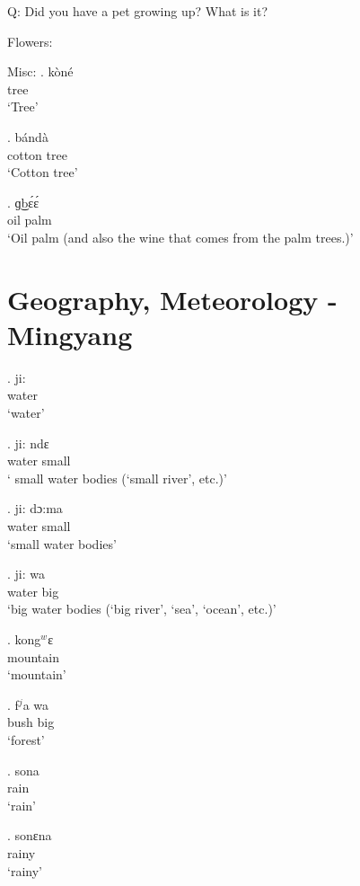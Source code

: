 \documentclass{assets/fieldnotes}
\begin{document}
Q: Did you have a pet growing up? What is it?

Flowers: 



Misc:
\exg. kòné\\
tree\\
`Tree'

\exg. bándà\\
cotton tree\\
`Cotton tree'

\exg. ɡ͜bɛ́ɛ́\\
oil palm\\
`Oil palm (and also the wine that comes from the palm trees.)'

\section{Geography, Meteorology - Mingyang} 
    \exg. ji:\\
    water\\
        `water'
        
    \exg. ji: ndɛ\\
    water small\\
       ` small water bodies (`small river', etc.)'

    \exg. ji: dɔ:ma\\
        water small\\
        `small water bodies'
    
    \exg. ji: wa\\
        water big\\
        `big water bodies (`big river', `sea', `ocean', etc.)'
        
    \exg. kong$^w$ɛ\\
    mountain\\
        `mountain'
           
    \exg. f$^j$a wa\\
        bush big\\
        `forest'

    \exg. sona\\
    rain\\
        `rain'

    \exg. sonɛna\\
    rainy\\
        `rainy'
        
\end{document}
